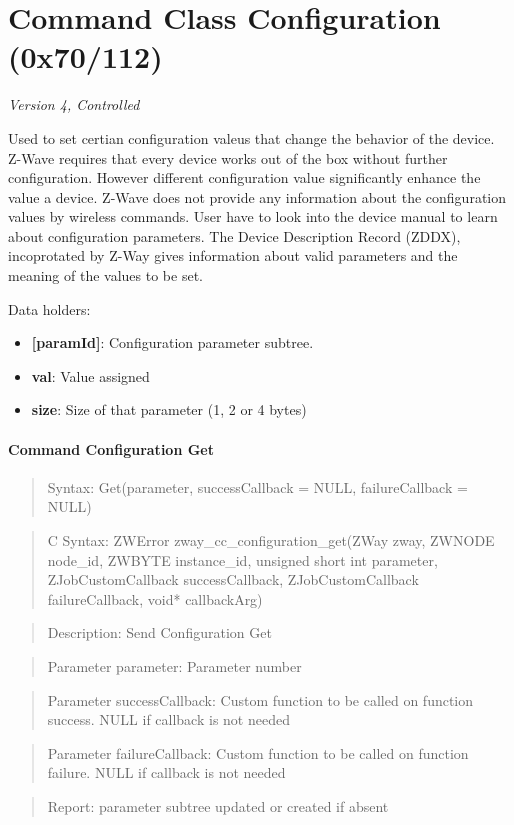 \section{Command Class Configuration (0x70/112)}

\textit{Version 4, Controlled}
\newline

Used to set certian configuration valeus that change the behavior of the device. Z-Wave requires that every device works out of the box without further configuration. However different configuration value significantly enhance the value a device. Z-Wave does not provide any information about the configuration values by wireless commands. User have to look into the device manual to learn about configuration parameters. The Device Description Record (ZDDX), incoprotated by Z-Way gives information about valid parameters and the meaning of the values to be set.
\newline

\noindent
Data holders:

\begin{itemize}
\item \textbf{[paramId]}: Configuration parameter subtree.
\item \qquad\textbf{val}: Value assigned
\item \qquad\textbf{size}: Size of that parameter (1, 2 or 4 bytes)
\end{itemize}

\paragraph{Command Configuration Get}
\begin{quote}Syntax: Get(parameter, successCallback = NULL, failureCallback = NULL)\end{quote}
\begin{quote}C Syntax: ZWError zway\_cc\_configuration\_get(ZWay zway, ZWNODE node\_id, ZWBYTE instance\_id, unsigned short int parameter, ZJobCustomCallback successCallback, ZJobCustomCallback failureCallback, void* callbackArg)\end{quote}
\begin{quote}Description: Send Configuration Get\end{quote}
\begin{quote}Parameter parameter: Parameter number\end{quote}
\begin{quote}Parameter successCallback: Custom function to be called on function success. NULL if callback is not needed\end{quote}
\begin{quote}Parameter failureCallback: Custom function to be called on function failure. NULL if callback is not needed\end{quote}
\begin{quote}Report: parameter subtree updated or created if absent\end{quote}

